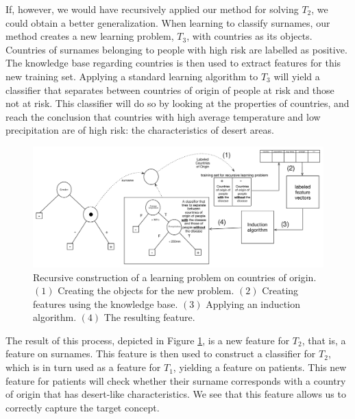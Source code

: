 \documentclass{article}
\theoremstyle{definition}
\begin{document}
If, however, we would have recursively applied our method for solving $T_2$, we could obtain a better generalization.
When learning to classify surnames, our method creates a new learning problem, $T_3$, with countries as its objects. Countries of surnames belonging to people with high risk are labelled as positive. The knowledge base regarding countries is then used to extract features for this new training set.
Applying a standard learning algorithm to $T_3$ will yield a classifier that separates between countries of origin of people at risk and those not at risk. This classifier will do so by looking at the properties of countries, and reach the conclusion that countries with high average temperature and low precipitation are of high risk: the characteristics of desert areas. 

\begin{figure}[th]
	\centering
	\includegraphics[width=0.9\linewidth,height=0.33\linewidth]{fig4_annotated.pdf}
	\caption{Recursive construction of a learning problem on countries of origin. $(1)$ Creating the objects for the new problem. $(2)$ Creating features using the knowledge base. $(3)$ Applying an induction algorithm. $(4)$ The resulting feature.}
	\label{fig:moving_to_lvl2}
\end{figure}

 The result of this process, depicted in Figure \ref{fig:moving_to_lvl2}, is a new feature for $T_2$, that is, a feature on surnames. This feature is then used to construct a classifier for $T_2$, which is in turn used as a feature for $T_1$, yielding a feature on patients. This new feature for patients will check whether their surname corresponds with a country of origin that has desert-like characteristics. We see that this feature allows us to correctly capture the target concept.
 
\end{document}
